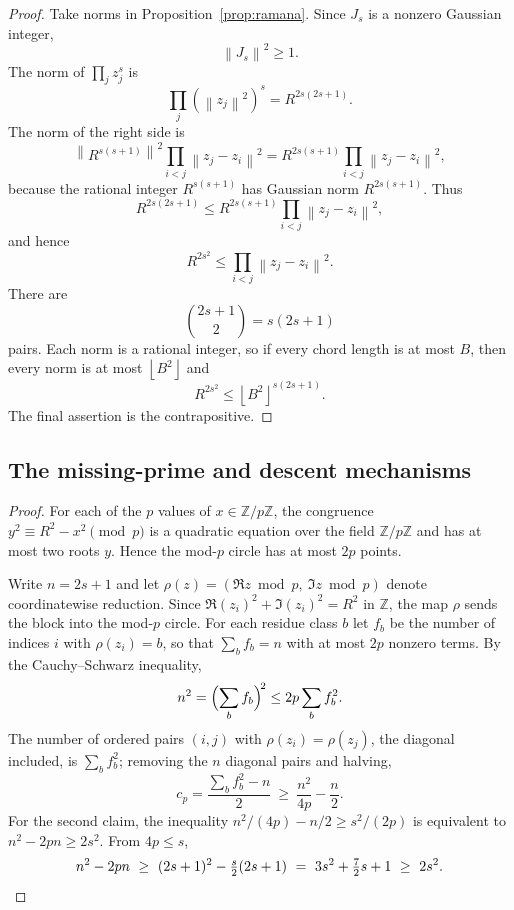 \documentclass[11pt]{article}
\newcommand{\Z}{\mathbb Z}
\newcommand{\Norm}[1]{\left\lVert#1\right\rVert^2}
\newcommand{\floor}[1]{\left\lfloor #1 \right\rfloor}
\begin{document}
\begin{proof}
Take norms in Proposition~\ref{prop:ramana}.
Since \(J_s\) is a nonzero Gaussian integer,
\[
  \Norm{J_s}\ge 1.
\]
The norm of \(\prod_j z_j^s\) is
\[
  \prod_j \left(\Norm{z_j}\right)^s=R^{2s(2s+1)}.
\]
The norm of the right side is
\[
    \Norm{ R^{s(s+1)} }
  \prod_{i<j}\Norm{z_j-z_i}
  =
  R^{2s(s+1)}\prod_{i<j}\Norm{z_j-z_i},
\]
because the rational integer \(R^{s(s+1)}\) has Gaussian norm \(R^{2s(s+1)}\).
Thus
\[
  R^{2s(2s+1)}
  \le
  R^{2s(s+1)}\prod_{i<j}\Norm{z_j-z_i},
\]
and hence
\[
  R^{2s^2}\le \prod_{i<j}\Norm{z_j-z_i}.
\]
There are
\[
  \binom{2s+1}{2}=s(2s+1)
\]
pairs.
Each norm is a rational integer, so if every chord length is at most \(B\), then every norm is at most \(\floor{B^2}\) and
\[
  R^{2s^2}\le \floor{B^2}^{s(2s+1)}.
\]
The final assertion is the contrapositive.
\end{proof}

\subsection{The missing-prime and descent mechanisms}
\label{app:missing}

\residuecollisions*

\begin{proof}
For each of the \(p\) values of \(x\in\Z/p\Z\), the congruence \(y^2\equiv R^2-x^2\pmod p\) is a quadratic equation over the field \(\Z/p\Z\) and has at most two roots \(y\).
Hence the mod-\(p\) circle has at most \(2p\) points.

Write \(n=2s+1\) and let \(\rho(z)=(\Re z\bmod p,\ \Im z\bmod p)\) denote coordinatewise reduction.
Since \(\Re(z_i)^2+\Im(z_i)^2=R^2\) in \(\Z\), the map \(\rho\) sends the block into the mod-\(p\) circle.
For each residue class \(b\) let \(f_b\) be the number of indices \(i\) with \(\rho(z_i)=b\), so that \(\sum_b f_b=n\) with at most \(2p\) nonzero terms.
By the Cauchy--Schwarz inequality,
\[
  n^2=\Bigl(\sum_b f_b\Bigr)^{\!2}\le 2p\sum_b f_b^2 .
\]
The number of ordered pairs \((i,j)\) with \(\rho(z_i)=\rho(z_j)\), the diagonal included, is \(\sum_b f_b^2\); removing the \(n\) diagonal pairs and halving,
\[
  c_p=\frac{\sum_b f_b^2-n}{2}\ \ge\ \frac{n^2}{4p}-\frac n2 .
\]
For the second claim, the inequality \(n^2/(4p)-n/2\ge s^2/(2p)\) is equivalent to \(n^2-2pn\ge 2s^2\).
From \(4p\le s\),
\[
  n^2-2pn\ \ge\ (2s+1)^2-\tfrac s2(2s+1)\ =\ 3s^2+\tfrac72 s+1\ \ge\ 2s^2 .
  \qedhere
\]
\end{proof}
\end{document}
